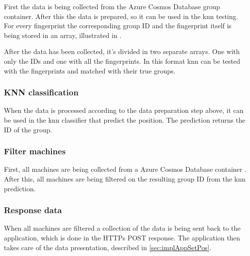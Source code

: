 \bigskip

First the data is being collected from the Azure Cosmos Database \cite{IntroductionAzureCosmos} group container. 
After this the data is prepared, so it can be used in the \acrshort{knn} testing.
For every fingerprint the corresponding group ID and the fingerprint itself is being stored in an array, illustrated in .


After the data has been collected, it's divided in two separate arrays.
One with only the IDs and one with all the fingerprints.
In this format \acrshort{knn} can be tested with the fingerprints and matched with their true groups.


\subsubsection{KNN classification}\label{sec:implServerSetPosKnnClassification}
When the data is processed according to the data preparation step above, it can be used in the \acrshort{knn} classifier that predict the position.
The prediction returns the ID of the group.

\subsubsection{Filter machines}\label{sec:implServerSetPosFilterMachines}
First, all machines are being collected from a Azure Cosmos Database container \cite{IntroductionAzureCosmos}.
After this, all machines are being filtered on the resulting group ID from the \acrshort{knn} prediction.

\subsubsection{Response data}\label{sec:implServerSetPosResponse}
When all machines are filtered a collection of the data is being sent back to the application, which is  done in the HTTPs POST response.
The application then takes care of the data presentation, described in \cref{sec:implAppSetPos}.

